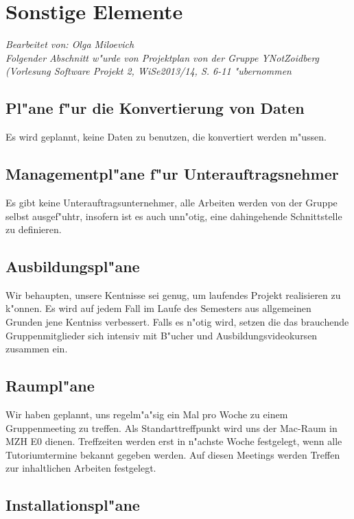 \section{Sonstige Elemente}

\textit{Bearbeitet von: Olga Miloevich}\\

\textit{Folgender Abschnitt w"urde von Projektplan von der Gruppe YNotZoidberg (Vorlesung Software Projekt 2, WiSe2013/14, S. 6-11 "ubernommen}\\

\subsection{Pl"ane f"ur die Konvertierung von Daten}
Es wird geplannt, keine Daten zu benutzen, die konvertiert werden m"ussen.

\subsection{Managementpl"ane f"ur Unterauftragsnehmer}
Es gibt keine Unterauftragsunternehmer, alle Arbeiten werden von der Gruppe selbst ausgef"uhtr, insofern ist es auch unn"otig, eine dahingehende Schnittstelle zu definieren.

\subsection{Ausbildungspl"ane}
Wir behaupten, unsere Kentnisse sei genug, um laufendes Projekt realisieren zu k"onnen. Es wird auf jedem Fall im Laufe des Semesters aus allgemeinen Grunden jene Kentniss verbessert. Falls es n"otig wird, setzen die das brauchende Gruppenmitglieder sich intensiv mit B"ucher und Ausbildungsvideokursen zusammen ein.

\subsection{Raumpl"ane}
Wir haben geplannt, uns regelm"a"sig ein Mal pro Woche zu einem Gruppenmeeting zu treffen. Als Standarttreffpunkt wird uns der Mac-Raum in MZH E0 dienen. Treffzeiten werden erst in n"achste Woche festgelegt, wenn alle Tutoriumtermine bekannt gegeben werden. Auf diesen Meetings werden Treffen zur inhaltlichen Arbeiten festgelegt. 

\subsection{Installationspl"ane}

